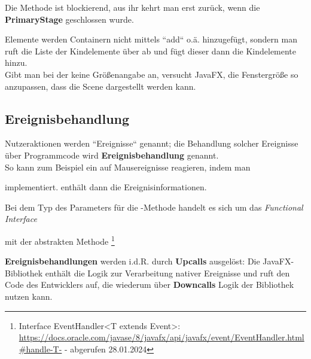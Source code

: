 \begin{tcolorbox}[enlarge top by=0.5cm,enlarge bottom by=0.5cm]
    Die Methode  ist blockierend, aus ihr kehrt man erst zurück, wenn die \textbf{PrimaryStage} geschlossen wurde.
\end{tcolorbox}

\noindent
Elemente werden Containern nicht mittels ``add`` o.ä. hinzugefügt, sondern man ruft die Liste der Kindelemente über  ab und fügt dieser dann die Kindelemente hinzu.\\

\noindent
Gibt man bei der  keine Größenangabe an, versucht JavaFX, die Fenstergröße so anzupassen, dass die Scene dargestellt werden kann.

\subsection{Ereignisbehandlung}

Nutzeraktionen werden ``Ereignisse`` genannt; die Behandlung solcher Ereignisse über Programmcode wird \textbf{Ereignisbehandlung} genannt.\\

\noindent
So kann zum Beispiel ein  auf Mausereignisse reagieren, indem man

\begin{center}\end{center}

implementiert.  enthält dann die Ereignisinformationen.

\begin{tcolorbox}[enlarge top by=0.5cm,enlarge bottom by=0.5cm]
    Bei dem Typ des Parameters für die -Methode handelt es sich um das \textit{Functional Interface}
     \begin{center}
     \end{center}
    mit der abstrakten Methode \footnote{
        Interface EventHandler<T extends Event>: \url{https://docs.oracle.com/javase/8/javafx/api/javafx/event/EventHandler.html#handle-T-} - abgerufen 28.01.2024
    }
\end{tcolorbox}

\noindent
\textbf{Ereignisbehandlungen} werden i.d.R. durch \textbf{Upcalls} ausgelöst: Die JavaFX-Bibliothek enthält die Logik zur Verarbeitung nativer Ereignisse und ruft den Code des Entwicklers auf, die wiederum über \textbf{Downcalls} Logik der Bibliothek nutzen kann.

